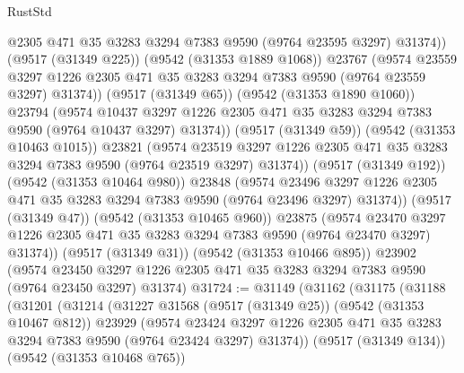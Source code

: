 \begin{lexlean}{RustStd}
\begin{coremodule}
                  @2305
                  @471
                  @35
                  @3283
                  @3294
                  @7383
                  @9590
                  (@9764 @23595 @3297)
                  @31374))
              (@9517 (@31349 @225))
              (@9542 (@31353 @1889 @1068))
              @23767
              (@9574
                @23559
                @3297
                @1226
                @2305
                @471
                @35
                @3283
                @3294
                @7383
                @9590
                (@9764 @23559 @3297)
                @31374))
            (@9517 (@31349 @65))
            (@9542 (@31353 @1890 @1060))
            @23794
            (@9574
              @10437
              @3297
              @1226
              @2305
              @471
              @35
              @3283
              @3294
              @7383
              @9590
              (@9764 @10437 @3297)
              @31374))
          (@9517 (@31349 @59))
          (@9542 (@31353 @10463 @1015))
          @23821
          (@9574
            @23519
            @3297
            @1226
            @2305
            @471
            @35
            @3283
            @3294
            @7383
            @9590
            (@9764 @23519 @3297)
            @31374))
        (@9517 (@31349 @192))
        (@9542 (@31353 @10464 @980))
        @23848
        (@9574
          @23496
          @3297
          @1226
          @2305
          @471
          @35
          @3283
          @3294
          @7383
          @9590
          (@9764 @23496 @3297)
          @31374))
      (@9517 (@31349 @47))
      (@9542 (@31353 @10465 @960))
      @23875
      (@9574 @23470 @3297 @1226 @2305 @471 @35 @3283 @3294 @7383 @9590 (@9764 @23470 @3297) @31374))
    (@9517 (@31349 @31))
    (@9542 (@31353 @10466 @895))
    @23902
    (@9574 @23450 @3297 @1226 @2305 @471 @35 @3283 @3294 @7383 @9590 (@9764 @23450 @3297) @31374)
@31724 := @31149
    (@31162
      (@31175
        (@31188
          (@31201
            (@31214
              (@31227
                @31568
                (@9517 (@31349 @25))
                (@9542 (@31353 @10467 @812))
                @23929
                (@9574
                  @23424
                  @3297
                  @1226
                  @2305
                  @471
                  @35
                  @3283
                  @3294
                  @7383
                  @9590
                  (@9764 @23424 @3297)
                  @31374))
              (@9517 (@31349 @134))
              (@9542 (@31353 @10468 @765))

\end{coremodule}
\end{lexlean}
